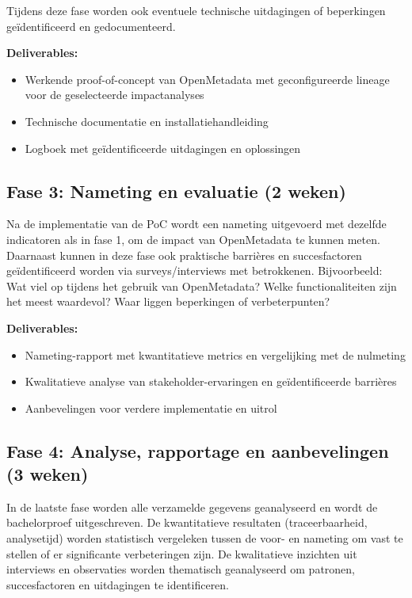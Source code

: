 Tijdens deze fase worden ook eventuele technische uitdagingen of beperkingen geïdentificeerd en gedocumenteerd.

\textbf{Deliverables:}
\begin{itemize}
    \item Werkende proof-of-concept van OpenMetadata met geconfigureerde lineage voor de geselecteerde impactanalyses
    \item Technische documentatie en installatiehandleiding
    \item Logboek met geïdentificeerde uitdagingen en oplossingen
\end{itemize}

\subsection{Fase 3: Nameting en evaluatie (2 weken)}
Na de implementatie van de PoC wordt een nameting uitgevoerd met dezelfde indicatoren als in fase 1, om de impact van OpenMetadata te kunnen meten.
Daarnaast kunnen in deze fase ook praktische barrières en succesfactoren geïdentificeerd worden via surveys/interviews met betrokkenen. Bijvoorbeeld: Wat viel op tijdens het gebruik van OpenMetadata? Welke functionaliteiten zijn het meest waardevol? Waar liggen beperkingen of verbeterpunten?

\textbf{Deliverables:}
\begin{itemize}
    \item Nameting-rapport met kwantitatieve metrics en vergelijking met de nulmeting
    \item Kwalitatieve analyse van stakeholder-ervaringen en geïdentificeerde barrières
    \item Aanbevelingen voor verdere implementatie en uitrol
\end{itemize}

\subsection{Fase 4: Analyse, rapportage en aanbevelingen (3 weken)}

In de laatste fase worden alle verzamelde gegevens geanalyseerd en wordt de bachelorproef uitgeschreven. De kwantitatieve resultaten (traceerbaarheid, analysetijd) worden statistisch vergeleken tussen de voor- en nameting om vast te stellen of er significante verbeteringen zijn. De kwalitatieve inzichten uit interviews en observaties worden thematisch geanalyseerd om patronen, succesfactoren en uitdagingen te identificeren.

